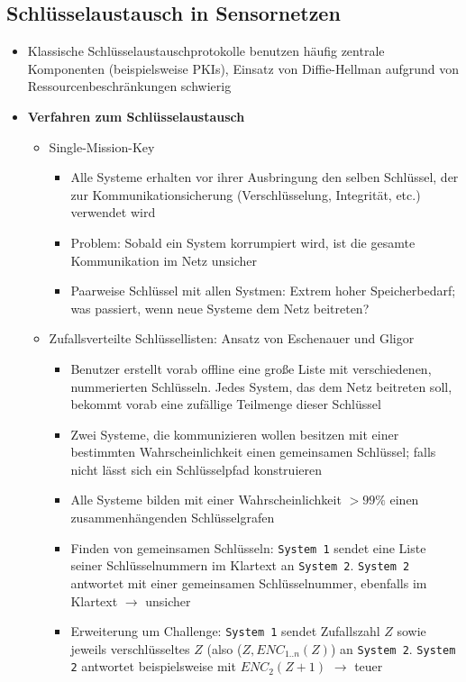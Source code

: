 \subsection{Schlüsselaustausch in Sensornetzen}
\begin{itemize}
	\item Klassische Schlüsselaustauschprotokolle benutzen häufig zentrale Komponenten (beispielsweise PKIs), Einsatz von Diffie-Hellman aufgrund von Ressourcenbeschränkungen schwierig
	\item \textbf{Verfahren zum Schlüsselaustausch}
	\begin{itemize}
		\item Single-Mission-Key
		\begin{itemize}
			\item Alle Systeme erhalten vor ihrer Ausbringung den selben Schlüssel, der zur Kommunikationsicherung (Verschlüsselung, Integrität, etc.) verwendet wird
			\item Problem: Sobald ein System korrumpiert wird, ist die gesamte Kommunikation im Netz unsicher
			\item Paarweise Schlüssel mit allen Systmen: Extrem hoher Speicherbedarf; was passiert, wenn neue Systeme dem Netz beitreten?
		\end{itemize}
		\item Zufallsverteilte Schlüssellisten: Ansatz von Eschenauer und Gligor
		\begin{itemize}
			\item Benutzer erstellt vorab offline eine große Liste mit verschiedenen, nummerierten Schlüsseln. Jedes System, das dem Netz beitreten soll, bekommt vorab eine zufällige Teilmenge dieser Schlüssel
			\item Zwei Systeme, die kommunizieren wollen besitzen mit einer bestimmten Wahrscheinlichkeit einen gemeinsamen Schlüssel; falls nicht lässt sich ein Schlüsselpfad konstruieren
			\item Alle Systeme bilden mit einer Wahrscheinlichkeit \(>99\%\) einen zusammenhängenden Schlüsselgrafen
			\item Finden von gemeinsamen Schlüsseln: \texttt{System 1} sendet eine Liste seiner Schlüsselnummern im Klartext an \texttt{System 2}. \texttt{System 2} antwortet mit einer gemeinsamen Schlüsselnummer, ebenfalls im Klartext \(\rightarrow\) unsicher
			\item Erweiterung um Challenge: \texttt{System 1} sendet Zufallszahl \(Z\) sowie jeweils verschlüsseltes \(Z\) (also (\(Z, ENC_{1..n}(Z)\)) an \texttt{System 2}. \texttt{System 2} antwortet beispielsweise mit \(ENC_2(Z+1)\) \(\rightarrow\) teuer

\end{itemize}
\end{itemize}
\end{itemize}
